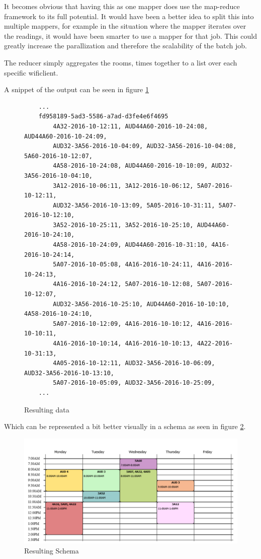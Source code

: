 It becomes obvious that having this as one mapper does use the map-reduce framework to its full potential. It would have been a better idea to split this into multiple mappers, for example in the situation where the mapper iterates over the readings, it would have been smarter to use a mapper for that job. This could greatly increase the parallization and therefore the scalability of the batch job.

The reducer simply aggregates the rooms, times together to a list over each specific wificlient.

A snippet of the output can be seen in figure \ref{fig:result_data}
\begin{figure}[p]
	\caption{Resulting data}
	\label{fig:result_data}
	\begin{verbatim}
	...
	fd958189-5ad3-5586-a7ad-d3fe4e6f4695	
	    4A32-2016-10-12:11, AUD44A60-2016-10-24:08, AUD44A60-2016-10-24:09, 
	    AUD32-3A56-2016-10-04:09, AUD32-3A56-2016-10-04:08, 5A60-2016-10-12:07, 
	    4A58-2016-10-24:08, AUD44A60-2016-10-10:09, AUD32-3A56-2016-10-04:10, 
	    3A12-2016-10-06:11, 3A12-2016-10-06:12, 5A07-2016-10-12:11, 
	    AUD32-3A56-2016-10-13:09, 5A05-2016-10-31:11, 5A07-2016-10-12:10,
	    3A52-2016-10-25:11, 3A52-2016-10-25:10, AUD44A60-2016-10-24:10,
	    4A58-2016-10-24:09, AUD44A60-2016-10-31:10, 4A16-2016-10-24:14,
	    5A07-2016-10-05:08, 4A16-2016-10-24:11, 4A16-2016-10-24:13,
	    4A16-2016-10-24:12, 5A07-2016-10-12:08, 5A07-2016-10-12:07,
	    AUD32-3A56-2016-10-25:10, AUD44A60-2016-10-10:10, 4A58-2016-10-24:10,
	    5A07-2016-10-12:09, 4A16-2016-10-10:12, 4A16-2016-10-10:11,
	    4A16-2016-10-10:14, 4A16-2016-10-10:13, 4A22-2016-10-31:13,
	    4A05-2016-10-12:11, AUD32-3A56-2016-10-06:09, AUD32-3A56-2016-10-13:10,
	    5A07-2016-10-05:09, AUD32-3A56-2016-10-25:09,
	...
	\end{verbatim}
\end{figure}

Which can be represented a bit better visually in a schema as seen in figure \ref{fig:result_schema}.

\begin{figure}[p]
	\centering
	\includegraphics[width=\linewidth]{figures/schema-from-data.png}
	\caption{Resulting Schema}
	\label{fig:result_schema}
\end{figure}

